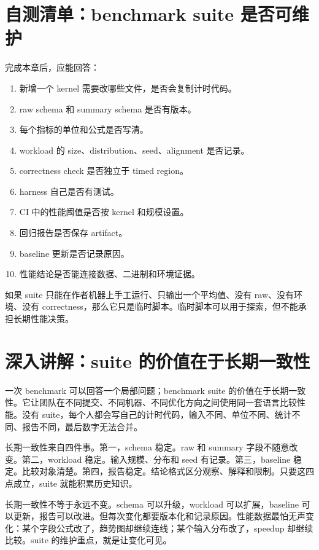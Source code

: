 \section{自测清单：benchmark suite 是否可维护}

完成本章后，应能回答：

\begin{enumerate}
  \item 新增一个 kernel 需要改哪些文件，是否会复制计时代码。
  \item raw schema 和 summary schema 是否有版本。
  \item 每个指标的单位和公式是否写清。
  \item workload 的 size、distribution、seed、alignment 是否记录。
  \item correctness check 是否独立于 timed region。
  \item harness 自己是否有测试。
  \item CI 中的性能阈值是否按 kernel 和规模设置。
  \item 回归报告是否保存 artifact。
  \item baseline 更新是否记录原因。
  \item 性能结论是否能连接数据、二进制和环境证据。
\end{enumerate}

如果 suite 只能在作者机器上手工运行、只输出一个平均值、没有 raw、没有环境、没有 correctness，那么它只是临时脚本。临时脚本可以用于探索，但不能承担长期性能决策。

\section{深入讲解：suite 的价值在于长期一致性}

一次 benchmark 可以回答一个局部问题；benchmark suite 的价值在于长期一致性。它让团队在不同提交、不同机器、不同优化方向之间使用同一套语言比较性能。没有 suite，每个人都会写自己的计时代码，输入不同、单位不同、统计不同、报告不同，最后数字无法合并。

长期一致性来自四件事。第一，schema 稳定。raw 和 summary 字段不随意改变。第二，workload 稳定。输入规模、分布和 seed 有记录。第三，baseline 稳定。比较对象清楚。第四，报告稳定。结论格式区分观察、解释和限制。只要这四点成立，suite 就能积累历史知识。

长期一致性不等于永远不变。schema 可以升级，workload 可以扩展，baseline 可以更新，报告可以改进。但每次变化都要版本化和记录原因。性能数据最怕无声变化：某个字段公式改了，趋势图却继续连线；某个输入分布改了，speedup 却继续比较。suite 的维护重点，就是让变化可见。

